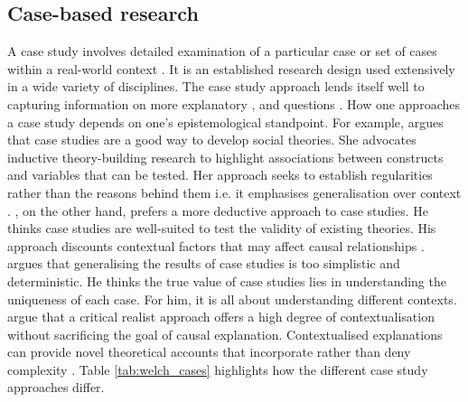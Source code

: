\subsection{Case-based research}

A case study involves detailed examination of a particular case or set of cases within a real-world context \citep{crowe2011case}. It is an established research design used extensively in a wide variety of disciplines. The case study approach lends itself well to capturing information on more explanatory ,  and  questions \citep{crowe2011case}. How one approaches a case study depends on one's epistemological standpoint. For example, \citet{eisenhardt1989building} argues that case studies are a good way to develop social theories. She advocates inductive theory-building research to highlight associations between constructs and variables that can be tested. Her approach seeks to establish regularities rather than the reasons behind them i.e. it emphasises generalisation over context \citep{welch2011theorising}. \citet{yin2009case}, on the other hand, prefers a more deductive approach to case studies. He thinks case studies are well-suited to test the validity of existing theories. His approach discounts contextual factors that may affect causal relationships \citep{welch2011theorising}. \citet{stake2005qualitative} argues that generalising the results of case studies is too simplistic and deterministic. He thinks the true value of case studies lies in understanding the uniqueness of each case. For him, it is all about understanding different contexts. \citet{welch2011theorising} argue that a critical realist approach offers a high degree of contextualisation without sacrificing the goal of causal explanation. Contextualised explanations can provide novel theoretical accounts that incorporate rather than deny complexity \citep{ragin2009reflections}. Table \ref{tab:welch_cases} highlights how the different case study approaches differ.  \medskip

